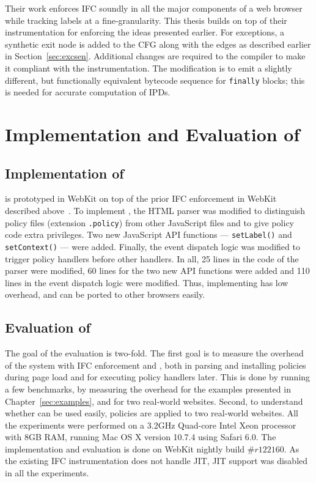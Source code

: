 Their work enforces IFC soundly in all the major components of 
a web browser while tracking labels at a fine-granularity. This thesis 
builds on top of their instrumentation for enforcing the ideas presented 
earlier. For exceptions, a synthetic exit node is added to the CFG
along with the edges as described earlier in
Section~\ref{sec:excsen}. Additional changes are required to the
compiler to make it compliant with the instrumentation. The
modification is to emit a slightly different, but functionally
equivalent bytecode sequence for \texttt{finally} blocks; 
this is needed for accurate computation of IPDs. 


\section{Implementation and Evaluation of \sys}
\label{sec:implpol}
\subsection{Implementation of \sys}
{\sys} is prototyped in WebKit on top of the prior IFC enforcement in
WebKit described above~\cite{just11PLASTIC,post14,csf15}. To implement
{\sys}, the HTML parser was modified to distinguish policy files
(extension \texttt{.policy}) from other JavaScript files and to give
policy code extra privileges. Two new JavaScript API functions ---
\texttt{setLabel()} and \texttt{setContext()} --- were added. Finally,
the event dispatch logic was modified to trigger policy handlers
before other handlers. In all, 25 lines in the code of the parser were
modified, 60 lines for the two new API functions were added and 110
lines in the event dispatch logic were modified. Thus, implementing
{\sys} has low overhead, and can be ported to other browsers easily.

\subsection{Evaluation of \sys}
\label{sec:eval-webpol}
The goal of the evaluation is two-fold. The first goal is to measure
the overhead of the system with IFC enforcement and {\sys}, both in
parsing and installing policies during page load and for executing
policy handlers later. This is done by running a few benchmarks, by measuring the
overhead for the examples presented in Chapter~\ref{sec:examples}, and
for two real-world websites. Second, to 
understand whether {\sys} can be used easily, {\sys} policies are
applied to two real-world websites. All the experiments were
performed on a 3.2GHz Quad-core Intel Xeon processor with 8GB RAM,
running Mac OS X version 10.7.4 using Safari 6.0. The implementation
and evaluation is done on WebKit nightly build $\#r122160$. As the
existing IFC instrumentation does not handle JIT, JIT support was
disabled in all the experiments. 

